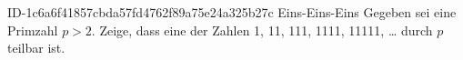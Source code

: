 \begin{exercise}
      {ID-1c6a6f41857cbda57fd4762f89a75e24a325b27c}
      {Eins-Eins-Eins}
  \ifproblem\problem
    Gegeben sei eine Primzahl $p>2$. Zeige, dass eine der Zahlen
    1, 11, 111, 1111, 11111, \ldots{} durch $p$ teilbar ist.
  \fi
\end{exercise}
